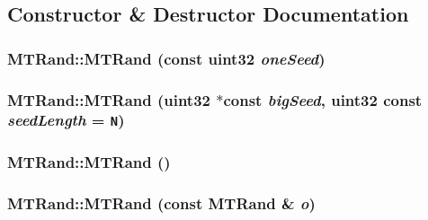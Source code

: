 \begin{CompactItemize}
\begin{CompactItemize}
\subsection{Constructor \& Destructor Documentation}
\hypertarget{classMTRand_172bc7e7cf1e578ef3f9c90a8cee3eb1}{
\subsubsection[{MTRand}]{\setlength{\rightskip}{0pt plus 5cm}MTRand::MTRand (const {\bf uint32} {\em oneSeed})}}
\label{classMTRand_172bc7e7cf1e578ef3f9c90a8cee3eb1}


\hypertarget{classMTRand_380e79e0192b46426abcefa6e2dd082e}{
\subsubsection[{MTRand}]{\setlength{\rightskip}{0pt plus 5cm}MTRand::MTRand ({\bf uint32} $\ast$const  {\em bigSeed}, \/  {\bf uint32} const {\em seedLength} = {\tt N})}}
\label{classMTRand_380e79e0192b46426abcefa6e2dd082e}


\hypertarget{classMTRand_265dc65546e26073c0d5f8787b045a1d}{
\subsubsection[{MTRand}]{\setlength{\rightskip}{0pt plus 5cm}MTRand::MTRand ()}}
\label{classMTRand_265dc65546e26073c0d5f8787b045a1d}


\hypertarget{classMTRand_ff69d4a4ec88475bab03a295e8fb0f60}{
\subsubsection[{MTRand}]{\setlength{\rightskip}{0pt plus 5cm}MTRand::MTRand (const {\bf MTRand} \& {\em o})}}
\label{classMTRand_ff69d4a4ec88475bab03a295e8fb0f60}





\end{CompactItemize}
\end{CompactItemize}
